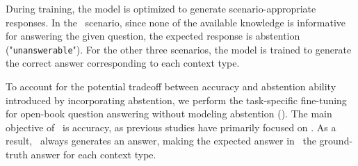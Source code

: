 During training, the model is optimized to generate scenario-appropriate responses.
In the \UU\ scenario, since none of the available knowledge is informative for answering the given question, the expected response is abstention ("\texttt{unanswerable}").
For the other three scenarios, the model is trained to generate the correct answer corresponding to each context type.


To account for the potential tradeoff between accuracy and abstention ability introduced by incorporating abstention, we perform the task-specific fine-tuning for open-book question answering without modeling abstention (\baseline).
The main objective of \baseline\ is accuracy, as previous studies have primarily focused on \citep{li-etal-2023-large, yoran2023making}.
As a result, \baseline\ always generates an answer, making the expected answer in \UU\ the ground-truth answer for each context type.




